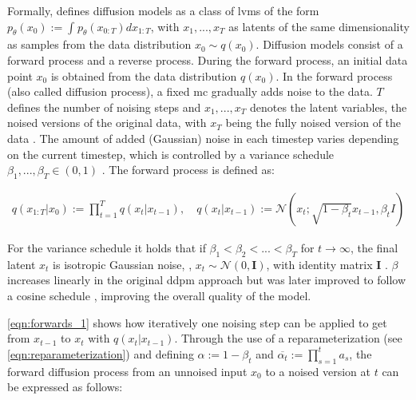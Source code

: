 Formally, \cite{ho2020DenoisingDiffusionProbabilistic} defines diffusion models as a class of \glspl{lvm} of the form $p_\theta(x_0):= \int_{}^{}p_\theta(x_{0:T})dx_{1:T}$,
with $x_1, ..., x_T$ as latents of the same dimensionality as samples from the data distribution $x_0 \sim q(x_0)$.
Diffusion models consist of a forward process and a reverse process.
During the forward process, an initial data point $x_0$ is obtained from the data distribution $q(x_0)$.
In the forward process (also called diffusion process), a fixed \gls{mc} gradually adds noise to the data.
$T$ defines the number of noising steps and $x_1,...,x_T$ denotes the latent variables, \ie the noised versions of the original data, with $x_T$ being the fully noised version of the data \cite{ho2020DenoisingDiffusionProbabilistic}.
The amount of added (Gaussian) noise in each timestep varies depending on the current timestep, which is controlled by a variance schedule $\beta_1, ..., \beta_T \in (0,1)$ \cite{ho2020DenoisingDiffusionProbabilistic}.
The forward process is defined as:

\begin{equation}
  \label{eqn:forwards_1}
  \begin{align*}
    q(x_{1:T} | x_0) := \prod_{t=1}^T q(x_t | x_{t-1}), \quad
    q(x_t | x_{t-1}) := \mathcal{N}(x_t; \sqrt{1 - \beta_t} x_{t-1}, \beta_t I)
  \end{align*}
\end{equation}

For the variance schedule it holds that if $\beta_1 < \beta_2 < ... < \beta_T$ for $t\rightarrow\infty$, the final latent $x_t$ is isotropic Gaussian noise, \ie, $x_t \sim \mathcal{N}(0, \textbf{I})$, with identity matrix $\textbf{I}$ \cite{zbinden2022ImplementingExperimentingDiffusion}.
$\beta$ increases linearly in the original \gls{ddpm} approach \cite{ho2020DenoisingDiffusionProbabilistic} but was later improved to follow a cosine schedule \cite{nichol2021ImprovedDenoisingDiffusion}, improving the overall quality of the model.

\autoref{eqn:forwards_1} \cite{ho2020DenoisingDiffusionProbabilistic} shows how iteratively one noising step can be applied to get from $x_{t-1}$ to $x_t$ with $q(x_t | x_{t-1})$.
Through the use of a reparameterization (see \autoref{eqn:reparameterization}) and defining $\alpha := 1-\beta_t$ and $\overline{\alpha_t}:=\prod_{s=1}^{t}a_s$, 
the forward diffusion process from an unnoised input $x_0$ to a noised version at $t$ can be expressed as follows:


